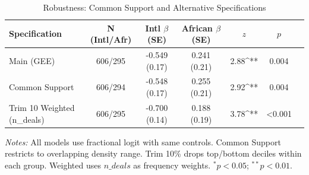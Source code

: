 
\begin{table}[htbp]
\centering
\caption{Robustness: Common Support and Alternative Specifications}
\label{tab:robustness_support}
\small
\begin{tabular}{lcccccc}
\toprule
Specification & N (Intl/Afr) & Intl $\beta$ (SE) & African $\beta$ (SE) & $z$ & $p$ \\
\midrule
Main (GEE) & 606/295 & -0.549 (0.17) & 0.241 (0.21) & 2.88^{**} & 0.004 \\
Common Support & 606/294 & -0.548 (0.17) & 0.255 (0.21) & 2.92^{**} & 0.004 \\
Trim 10%
Weighted (n\_deals) & 606/295 & -0.700 (0.14) & 0.188 (0.19) & 3.78^{**} & <0.001 \\

\bottomrule
\end{tabular}
\begin{tablenotes}
\small
\item \textit{Notes:} All models use fractional logit with same controls.
Common Support restricts to overlapping density range.
Trim 10\% drops top/bottom deciles within each group.
Weighted uses $n\_deals$ as frequency weights.
$^{*}p<0.05$; $^{**}p<0.01$.
\end{tablenotes}
\end{table}
